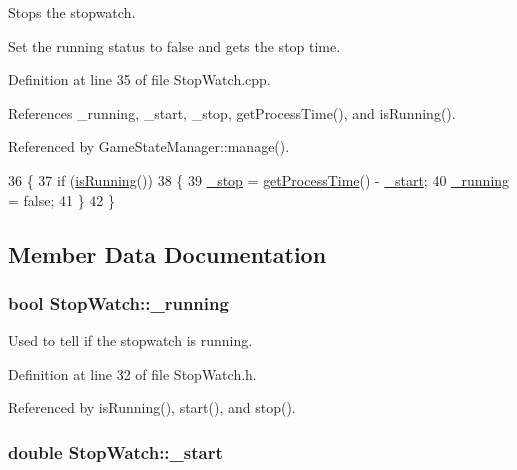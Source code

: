 Stops the stopwatch. 

Set the running status to false and gets the stop time. 

Definition at line 35 of file Stop\-Watch.\-cpp.



References \-\_\-running, \-\_\-start, \-\_\-stop, get\-Process\-Time(), and is\-Running().



Referenced by Game\-State\-Manager\-::manage().


\begin{DoxyCode}
36 \{
37     \textcolor{keywordflow}{if} (\hyperlink{classStopWatch_a4358045d32002cb83ec62d1ebb9fb5ca}{isRunning}())
38     \{
39         \hyperlink{classStopWatch_a553fb52b9dc9a4c3f1a388f31ae4d4bf}{\_stop} = \hyperlink{classStopWatch_a846093607050d32d90d1b359674af5d8}{getProcessTime}() - \hyperlink{classStopWatch_a36df11e96fae69eb56ff8feda10f07d2}{\_start};
40         \hyperlink{classStopWatch_a65a94d1a957f3f711b6ed41c85e86eca}{\_running} = \textcolor{keyword}{false};
41     \}
42 \}
\end{DoxyCode}


\subsection{Member Data Documentation}
\hypertarget{classStopWatch_a65a94d1a957f3f711b6ed41c85e86eca}{
\subsubsection[{\-\_\-running}]{\setlength{\rightskip}{0pt plus 5cm}bool Stop\-Watch\-::\-\_\-running\hspace{0.3cm}{\ttfamily [private]}}}\label{classStopWatch_a65a94d1a957f3f711b6ed41c85e86eca}


Used to tell if the stopwatch is running. 



Definition at line 32 of file Stop\-Watch.\-h.



Referenced by is\-Running(), start(), and stop().

\hypertarget{classStopWatch_a36df11e96fae69eb56ff8feda10f07d2}{
\subsubsection[{\-\_\-start}]{\setlength{\rightskip}{0pt plus 5cm}double Stop\-Watch\-::\-\_\-start\hspace{0.3cm}{\ttfamily [private]}}}\label{classStopWatch_a36df11e96fae69eb56ff8feda10f07d2}



